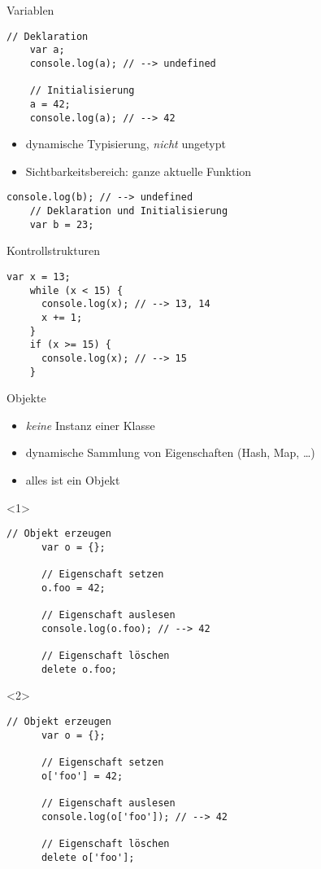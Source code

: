 \begin{frame}[fragile]{Variablen}
  \begin{lstlisting}[gobble=4]
    // Deklaration
    var a;
    console.log(a); // --> undefined
    
    // Initialisierung
    a = 42;
    console.log(a); // --> 42
  \end{lstlisting}
  
  \begin{itemize}
    \item dynamische Typisierung, \emph{nicht} ungetypt
    \item Sichtbarkeitsbereich: ganze aktuelle Funktion
  \end{itemize}
  
  \begin{lstlisting}[gobble=4]
    console.log(b); // --> undefined
    // Deklaration und Initialisierung
    var b = 23; 
  \end{lstlisting}  
\end{frame}

\begin{frame}[fragile]{Kontrollstrukturen}
  \begin{lstlisting}[gobble=4]
    var x = 13;
    while (x < 15) {
      console.log(x); // --> 13, 14
      x += 1;
    }
    if (x >= 15) {
      console.log(x); // --> 15
    }
  \end{lstlisting}
\end{frame}

\begin{frame}[fragile]{Objekte}
  \begin{itemize}
    \item \emph{keine} Instanz einer Klasse
    \item dynamische Sammlung von Eigenschaften (Hash, Map, \ldots)
    \item alles ist ein Objekt
  \end{itemize}
  
  \begin{onlyenv}<1>
    \begin{lstlisting}[gobble=6]
      // Objekt erzeugen
      var o = {};
      
      // Eigenschaft setzen
      o.foo = 42;
      
      // Eigenschaft auslesen
      console.log(o.foo); // --> 42
      
      // Eigenschaft löschen
      delete o.foo;
    \end{lstlisting}
  \end{onlyenv}
  
  \begin{onlyenv}<2>
    \begin{lstlisting}[gobble=6]
      // Objekt erzeugen
      var o = {};
      
      // Eigenschaft setzen
      o['foo'] = 42;
      
      // Eigenschaft auslesen
      console.log(o['foo']); // --> 42
      
      // Eigenschaft löschen
      delete o['foo'];
    \end{lstlisting}
  \end{onlyenv}
\end{frame}

